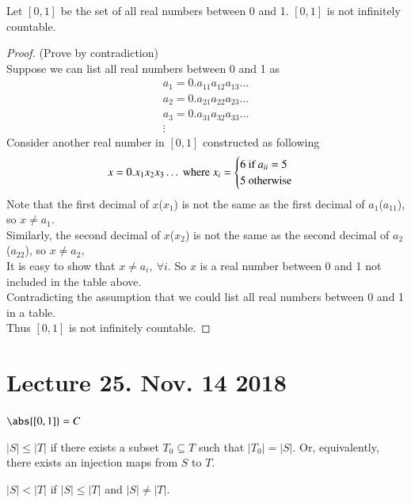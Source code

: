 \documentclass[10pt]{article}
\begin{document}
		\begin{theorem}
			Let $[0,1]$ be the set of all real numbers between 0 and 1. $[0,1]$ is not infinitely countable.
		\end{theorem}
		\begin{proof}
			(Prove by contradiction) \\
			Suppose we can list all real numbers between 0 and 1 as 
			\begin{gather*}
				a_1 = 0.a_{11}a_{12}a_{13}\dots \\
				a_2 = 0.a_{21}a_{22}a_{23}\dots \\
				a_3 = 0.a_{31}a_{32}a_{33}\dots \\
				\vdots
			\end{gather*}
			Consider another real number in $[0,1]$ constructed as following
			\[
				x = 0.x_1 x_2 x_3 \dots \text{{ where }} x_i = \begin{cases}
					6 \text{{ if }} a_{ii} = 5 \\
					5 \text{{ otherwise}}
				\end{cases}
			\]
			Note that the first decimal of $x$($x_1$) is not the same as the first decimal of $a_1$($a_{11}$), so $x \neq a_1$. \\
			Similarly, the second decimal of $x$($x_2$) is not the same as the second decimal of $a_2$($a_{22}$), so $x \neq a_2$, \\
			It is easy to show that $x \neq a_i,\ \forall i$. So $x$ is a real number between 0 and 1 not included in the table above. \\
			Contradicting the assumption that we could list all real numbers between 0 and 1 in a table. \\
			Thus $[0,1]$ is not infinitely countable.
		\end{proof}
		
	\section{Lecture 25. Nov. 14 2018}
		\begin{notation}
			$\abs{[0,1]}=C$
		\end{notation}
		
		\begin{definition}
			$|S| \leq |T|$ if there exists a subset $T_0 \subseteq T$ such that $|T_0| = |S|$. Or, equivalently, there exists an injection maps from $S$ to $T$.
		\end{definition}
		
		\begin{definition}
			$|S| < |T|$ if $|S| \leq |T|$ and $|S| \neq |T|$.
		\end{definition}
		
\end{document}
